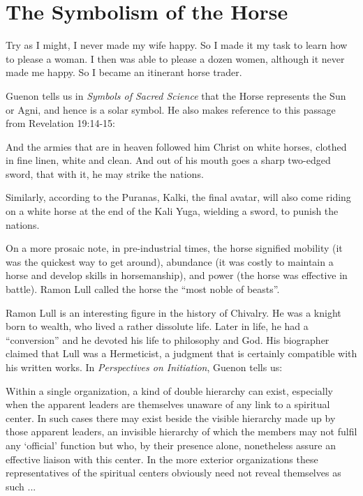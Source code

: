 \section{The Symbolism of the Horse}

\begin{quotex}
Try as I might, I never made my wife happy. So I made it my task to learn how to please a woman. I then was able to please a dozen women, although it never made me happy. So I became an itinerant horse trader.
\end{quotex}

Guenon tells us in \emph{Symbols of Sacred Science} that the Horse represents the Sun or Agni, and hence is a solar symbol. He also makes reference to this passage from Revelation 19:14-15:

\begin{quotex}
And the armies that are in heaven followed him Christ on white horses, clothed in fine linen, white and clean. And out of his mouth goes a sharp two-edged sword, that with it, he may strike the nations.
\end{quotex}


Similarly, according to the Puranas, Kalki, the final avatar, will also come riding on a white horse at the end of the Kali Yuga, wielding a sword, to punish the nations.

On a more prosaic note, in pre-industrial times, the horse signified mobility (it was the quickest way to get around), abundance (it was costly to maintain a horse and develop skills in horsemanship), and power (the horse was effective in battle). Ramon Lull called the horse the ``most noble of beasts''.

Ramon Lull is an interesting figure in the history of Chivalry. He was a knight born to wealth, who lived a rather dissolute life. Later in life, he had a ``conversion'' and he devoted his life to philosophy and God. His biographer claimed that Lull was a Hermeticist, a judgment that is certainly compatible with his written works. In \emph{Perspectives on Initiation}, Guenon tells us:

\begin{quotex}
Within a single organization, a kind of double hierarchy can exist, especially when the apparent leaders are themselves unaware of any link to a spiritual center. In such cases there may exist beside the visible hierarchy made up by those apparent leaders, an invisible hierarchy of which the members may not fulfil any `official' function but who, by their presence alone, nonetheless assure an effective liaison with this center. In the more exterior organizations these representatives of the spiritual centers obviously need not reveal themselves as such ... \end{quotex}


